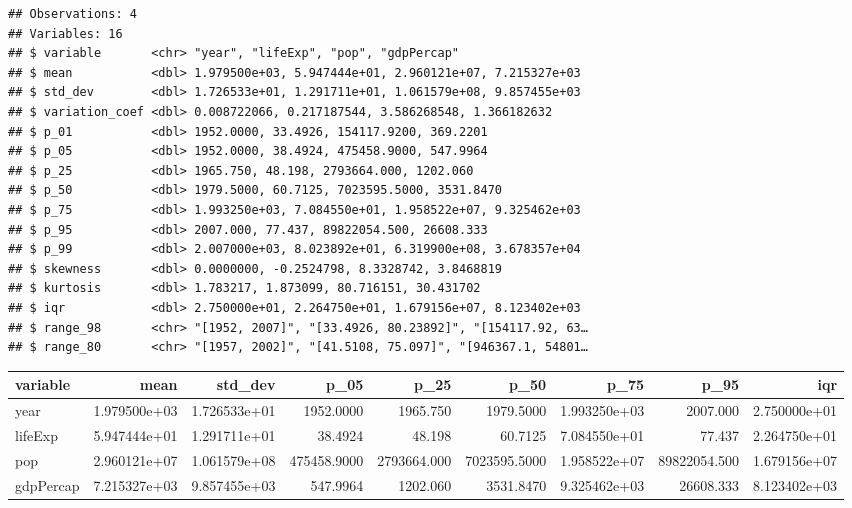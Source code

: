 \documentclass[]{book}
\newenvironment{Shaded}{\begin{snugshade}}{\end{snugshade}}
\newcommand{\KeywordTok}[1]{\textcolor[rgb]{0.13,0.29,0.53}{\textbf{#1}}}
\newcommand{\StringTok}[1]{\textcolor[rgb]{0.31,0.60,0.02}{#1}}
\newcommand{\CommentTok}[1]{\textcolor[rgb]{0.56,0.35,0.01}{\textit{#1}}}
\newcommand{\OperatorTok}[1]{\textcolor[rgb]{0.81,0.36,0.00}{\textbf{#1}}}
\newcommand{\NormalTok}[1]{#1}
\begin{document}
\begin{verbatim}
## Observations: 4
## Variables: 16
## $ variable       <chr> "year", "lifeExp", "pop", "gdpPercap"
## $ mean           <dbl> 1.979500e+03, 5.947444e+01, 2.960121e+07, 7.215327e+03
## $ std_dev        <dbl> 1.726533e+01, 1.291711e+01, 1.061579e+08, 9.857455e+03
## $ variation_coef <dbl> 0.008722066, 0.217187544, 3.586268548, 1.366182632
## $ p_01           <dbl> 1952.0000, 33.4926, 154117.9200, 369.2201
## $ p_05           <dbl> 1952.0000, 38.4924, 475458.9000, 547.9964
## $ p_25           <dbl> 1965.750, 48.198, 2793664.000, 1202.060
## $ p_50           <dbl> 1979.5000, 60.7125, 7023595.5000, 3531.8470
## $ p_75           <dbl> 1.993250e+03, 7.084550e+01, 1.958522e+07, 9.325462e+03
## $ p_95           <dbl> 2007.000, 77.437, 89822054.500, 26608.333
## $ p_99           <dbl> 2.007000e+03, 8.023892e+01, 6.319900e+08, 3.678357e+04
## $ skewness       <dbl> 0.0000000, -0.2524798, 8.3328742, 3.8468819
## $ kurtosis       <dbl> 1.783217, 1.873099, 80.716151, 30.431702
## $ iqr            <dbl> 2.750000e+01, 2.264750e+01, 1.679156e+07, 8.123402e+03
## $ range_98       <chr> "[1952, 2007]", "[33.4926, 80.23892]", "[154117.92, 63…
## $ range_80       <chr> "[1957, 2002]", "[41.5108, 75.097]", "[946367.1, 54801…
\end{verbatim}

\begin{Shaded}
\end{Shaded}

\begin{tabular}{l|r|r|r|r|r|r|r|r}
\hline
variable & mean & std\_dev & p\_05 & p\_25 & p\_50 & p\_75 & p\_95 & iqr\\
\hline
year & 1.979500e+03 & 1.726533e+01 & 1952.0000 & 1965.750 & 1979.5000 & 1.993250e+03 & 2007.000 & 2.750000e+01\\
\hline
lifeExp & 5.947444e+01 & 1.291711e+01 & 38.4924 & 48.198 & 60.7125 & 7.084550e+01 & 77.437 & 2.264750e+01\\
\hline
pop & 2.960121e+07 & 1.061579e+08 & 475458.9000 & 2793664.000 & 7023595.5000 & 1.958522e+07 & 89822054.500 & 1.679156e+07\\
\hline
gdpPercap & 7.215327e+03 & 9.857455e+03 & 547.9964 & 1202.060 & 3531.8470 & 9.325462e+03 & 26608.333 & 8.123402e+03\\
\hline
\end{tabular}
\end{document}
